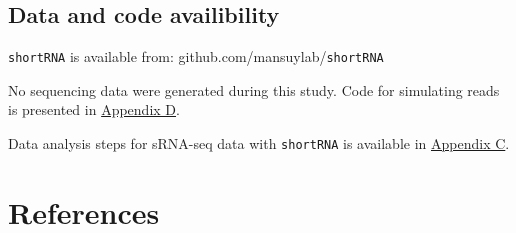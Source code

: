 \documentclass[12pt,twoside]{reedthesis}
\begin{document}
\hypertarget{data-and-code-availibility}{%
\section{Data and code availibility}\label{data-and-code-availibility}}

\texttt{shortRNA} is available from: github.com/mansuylab/\texttt{shortRNA}

No sequencing data were generated during this study. Code for simulating
reads is presented in \protect\hyperlink{ad}{Appendix D}.

Data analysis steps for sRNA-seq data with \texttt{shortRNA} is available in
\protect\hyperlink{ac}{Appendix C}.

\backmatter

\hypertarget{references}{%
\chapter*{References}\label{references}}


\noindent

\setlength{\parindent}{-0.20in}
\end{document}
